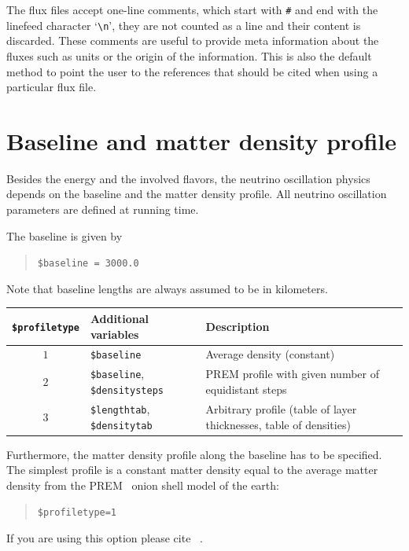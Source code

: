 The flux files accept one-line comments, which start
with {\tt \#} and end with the linefeed character `\verb+\n+', they are
not counted as a line and their content is discarded. These comments
are useful to provide meta information about the fluxes such as units
or the origin of the information. This is also the default method
to point the user to the references that should be cited when using
a particular flux file.

\section{Baseline and matter density profile}

Besides the energy and the involved flavors, the neutrino oscillation
physics depends on the baseline and the matter density profile.
All neutrino oscillation parameters are defined at running time.

The baseline is given by
\begin{quote}
{\tt \$baseline = 3000.0 }
\end{quote}
Note that baseline lengths are always assumed to be in
kilometers.

\begin{table}[t!]
\begin{tabular}{|clp{7cm}|}
\hline
{\tt \$profiletype} & Additional variables & Description \\ 
\hline
$1$ & {\tt \$baseline} & Average density (constant) \\
$2$ & {\tt \$baseline}, {\tt \$densitysteps} & PREM profile with given number of equidistant steps \\
$3$ & {\tt \$lengthtab},  {\tt \$densitytab} & Arbitrary profile (table of layer thicknesses, table of densities) \\
\hline
\end{tabular}
\end{table}


Furthermore, the matter density profile along the baseline
has to be specified. The simplest profile is a constant matter density equal to the average matter density from the PREM~\cite{Dziewonski:1981xy,Stacey} onion shell model of the earth:
\begin{quote}
{\tt \$profiletype=1 }
\end{quote}
%
If you are using this option please cite \Refs~\cite{Dziewonski:1981xy,Stacey}.

